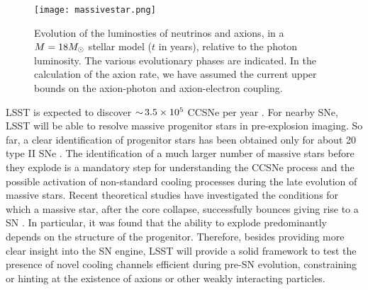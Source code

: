 \begin{figure}[t]
\centering
\texttt{[image: massivestar.png]}
\caption{Evolution of the luminosties of neutrinos and axions, in a $M=18 M_\odot$ stellar model ($t$ in years), relative to the photon luminosity. The various evolutionary phases are indicated. 
In the calculation of the axion rate, we have assumed the current upper bounds on the axion-photon and axion-electron coupling.
}
\label{fig:massivestar}
\end{figure}

LSST is expected to discover $ {\sim}\, 3.5\times10^5$ CCSNe per year \citep{Lien:2009}. 
For nearby SNe, LSST will be able to resolve massive progenitor stars in pre-explosion imaging. 
So far, a clear identification of progenitor stars has been obtained only for about 20 type II SNe \citep{Smartt:2015}.  
The identification of a much larger number of massive stars before they explode is a mandatory step for understanding the CCSNe process and the possible activation of non-standard cooling processes during the late evolution of massive stars. 
Recent theoretical studies have investigated the conditions for which a massive star, after the core collapse, successfully bounces giving rise to a SN \citep[\eg,][and references therein]{OConnor:2011,Sukhbold:2016}.   
In particular, it was found that the ability to explode predominantly depends on the structure of the progenitor. 
Therefore, besides providing more clear insight into the SN engine, LSST will provide a solid framework to test the presence of novel cooling channels efficient during pre-SN evolution, constraining or hinting at the existence of axions or other weakly interacting particles.


